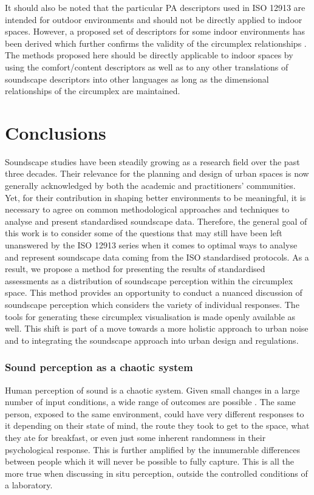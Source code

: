 It should also be noted that the particular PA descriptors used in ISO 12913 are intended for outdoor environments and should not be directly applied to indoor spaces. However, a proposed set of descriptors for some indoor environments has been derived which further confirms the validity of the circumplex relationships \citep{Torresin2020Indoor}. The methods proposed here should be directly applicable to indoor spaces by using the comfort/content descriptors as well as to any other translations of soundscape descriptors into other languages \citep{Aletta2020Soundscape} as long as the dimensional relationships of the circumplex are maintained.


\section{Conclusions}
Soundscape studies have been steadily growing as a research field over the past three decades. Their relevance for the planning and design of urban spaces is now generally acknowledged by both the academic and practitioners' communities. Yet, for their contribution in shaping better environments to be meaningful, it is necessary to agree on common methodological approaches and techniques to analyse and present standardised soundscape data. Therefore, the general goal of this work is to consider some of the questions that may still have been left unanswered by the ISO 12913 series when it comes to optimal ways to analyse and represent soundscape data coming from the ISO standardised protocols. As a result, we propose a method for presenting the results of standardised
assessments as a distribution of soundscape perception within the circumplex space. This method provides an opportunity to conduct a nuanced discussion of soundscape perception which considers the variety of individual responses. The tools for generating these circumplex visualisation is made openly available as well. This shift is part of a move towards a more holistic approach to urban noise and to integrating the soundscape approach into urban design and regulations.


\subsubsection{Sound perception as a chaotic system}

Human perception of sound is a chaotic system. Given small changes in a large number of input conditions, a wide range of outcomes are possible . The same person, exposed to the same environment, could have very different responses to it depending on their state of mind, the route they took to get to the space, what they ate for breakfast, or even just some inherent randomness in their psychological response. This is further amplified by the innumerable differences between people which it will never be possible to fully capture. This is all the more true when discussing in situ perception, outside the controlled conditions of a laboratory.

